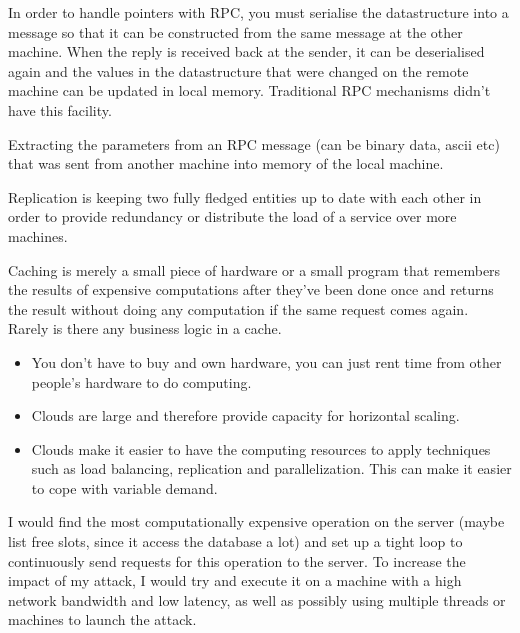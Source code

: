 In order to handle pointers with RPC, you must serialise the datastructure into
a message so that it can be constructed from the same message at the other
machine. When the reply is received back at the sender, it can be deserialised
again and the values in the datastructure that were changed on the remote
machine can be updated in local memory. Traditional RPC mechanisms didn't have
this facility.


Extracting the parameters from an RPC message (can be binary data, ascii etc)
that was sent from another machine into memory of the local machine.


Replication is keeping two fully fledged entities up to date with each other in
order to provide redundancy or distribute the load of a service over more
machines.

Caching is merely a small piece of hardware or a small program that remembers
the results of expensive computations after they've been done once and returns
the result without doing any computation if the same request comes again. Rarely
is there any business logic in a cache.


\begin{itemize}
  \item You don't have to buy and own hardware, you can just rent time from
    other people's hardware to do computing.
  \item Clouds are large and therefore provide capacity for horizontal scaling.
  \item Clouds make it easier to have the computing resources to apply
    techniques such as load balancing, replication and parallelization. This
    can make it easier to cope with variable demand.
\end{itemize}


I would find the most computationally expensive operation on the server (maybe
list free slots, since it access the database a lot) and set up a tight loop to
continuously send requests for this operation to the server. To increase the
impact of my attack, I would try and execute it on a machine with a high network
bandwidth and low latency, as well as possibly using multiple threads or
machines to launch the attack.

